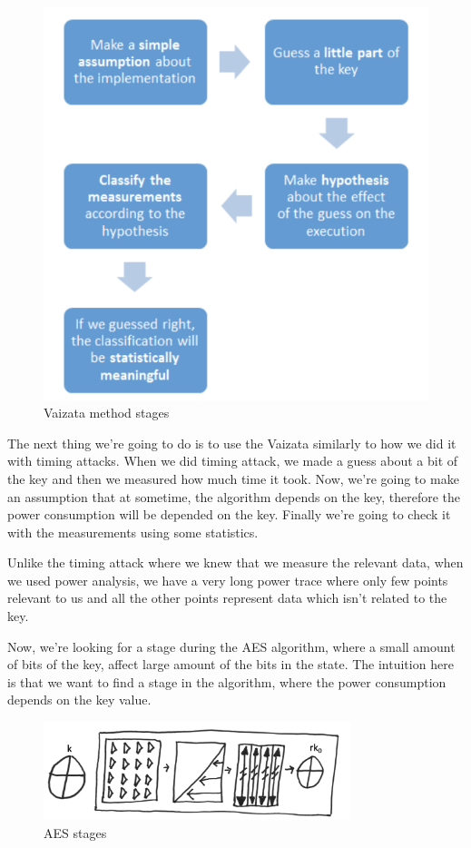 \begin{figure}[!ht]
    \centering
    \includegraphics[height=0.9\textwidth]{images/Lecture6/vaizata.png}
    \caption{Vaizata method stages} \label{fig:vaizata}
\end{figure}

The next thing we're going to do is to use the Vaizata similarly to how we did
it with timing attacks. When we did timing attack, we made a guess about a bit
of the key and then we measured how much time it took. Now, we're going to make
an assumption that at sometime, the algorithm depends on the key, therefore the
power consumption will be depended on the key. Finally we're going to check it
with the measurements using some statistics. 

Unlike the timing attack where we knew that we measure the relevant data, when
we used power analysis, we have a very long power trace where only few points
relevant to us and all the other points represent data which isn't related to
the key.

Now, we're looking for a stage during the AES algorithm, where a small amount of
bits of the key, affect large amount of the bits in the state. The intuition
here is that we want to find a stage in the algorithm, where the power
consumption depends on the key value.

\begin{figure}[!ht]
    \centering
    \includegraphics[width=0.8\textwidth]{images/Lecture6/AES-stages-figure.png}
    \caption{AES stages} \label{fig:aes-stages}
\end{figure}

